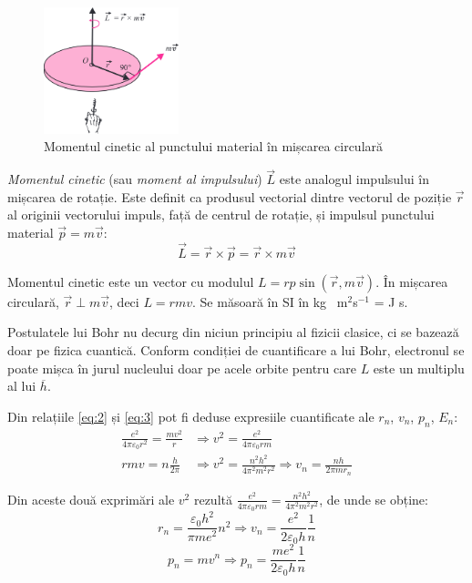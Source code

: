\begin{figure}
    \centering
    \includegraphics[width=0.35\textwidth]{fig/moment_cinetic}
    \caption{Momentul cinetic al punctului material în mișcarea circulară}
\end{figure}

\emph{Momentul cinetic} (sau \emph{moment al impulsului}) $\vec{L}$ este
analogul impulsului în mișcarea de rotație. Este definit ca produsul vectorial
dintre vectorul de poziție $\vec{r}$ al originii vectorului impuls, față de
centrul de rotație, și impulsul punctului material $\vec{p} = m\vec{v}$:
\[ \vec{L} = \vec{r} \times \vec{p} = \vec{r} \times m\vec{v} \]

Momentul cinetic este un vector cu modulul \( L = rp\sin(\vec{r}, m\vec{v}) \).
În mișcarea circulară, \( \vec{r} \perp m\vec{v} \), deci $L = rmv$. Se măsoară
în SI în kg \cdot\ m$^2$s$^{-1}$ = J \cdot s.

\clearpage

Postulatele lui Bohr nu decurg din niciun principiu al fizicii clasice, ci se
bazează doar pe fizica cuantică. Conform condiției de cuantificare a lui Bohr,
electronul se poate mișca în jurul nucleului doar pe acele orbite pentru care
$L$ este un multiplu al lui $\overline{h}$.

Din relațiile \eqref{eq:2} și \eqref{eq:3} pot fi deduse expresiile
cuantificate ale $r_n$, $v_n$, $p_n$, $E_n$:
\begin{align*}
    \frac{e^2}{4\pi\varepsilon_0 r^2} = \frac{mv^2}{r}
    &\Rightarrow v^2 = \frac{e^2}{4\pi\varepsilon_0 rm}
    \\
    rmv = n\frac{h}{2\pi} &\Rightarrow v^2 = \frac{n^2 h^2}{4\pi^2 m^2 r^2}
    \Rightarrow \boxed{v_n = \frac{nh}{2\pi mr_n}}
\end{align*}

Din aceste două exprimări ale $v^2$ rezultă
\( \frac{e^2}{4\pi\varepsilon_0 rm} = \frac{n^2 h^2}{4\pi^2 m^2 r^2} \), de
unde se obține:
\[
    \boxed{r_n = \frac{\varepsilon_0 h^2}{\pi me^2} n^2}
    \Rightarrow \boxed{v_n = \frac{e^2}{2\varepsilon_0 h} \frac{1}{n}}
\]
\[
    p_n = mv^n \Rightarrow
    \boxed{p_n = \frac{me^2}{2\varepsilon_0h} \frac{1}{n}}
\]

